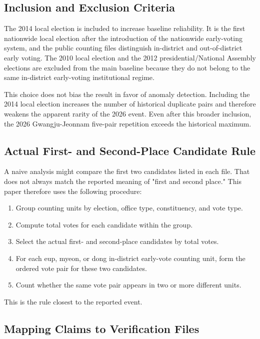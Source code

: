 \documentclass[preprint]{IEIE}
\begin{document}
\subsection{Inclusion and Exclusion Criteria}

The 2014 local election is included to increase baseline reliability. It is the first nationwide local election after the introduction of the nationwide early-voting system, and the public counting files distinguish in-district and out-of-district early voting. The 2010 local election and the 2012 presidential/National Assembly elections are excluded from the main baseline because they do not belong to the same in-district early-voting institutional regime.

This choice does not bias the result in favor of anomaly detection. Including the 2014 local election increases the number of historical duplicate pairs and therefore weakens the apparent rarity of the 2026 event. Even after this broader inclusion, the 2026 Gwangju-Jeonnam five-pair repetition exceeds the historical maximum.

\subsection{Actual First- and Second-Place Candidate Rule}

A naive analysis might compare the first two candidates listed in each file. That does not always match the reported meaning of "first and second place." This paper therefore uses the following procedure:

\begin{enumerate}
\item Group counting units by election, office type, constituency, and vote type.
\item Compute total votes for each candidate within the group.
\item Select the actual first- and second-place candidates by total votes.
\item For each eup, myeon, or dong in-district early-vote counting unit, form the ordered vote pair for these two candidates.
\item Count whether the same vote pair appears in two or more different units.
\end{enumerate}

This is the rule closest to the reported event.

\subsection{Mapping Claims to Verification Files}
\end{document}
